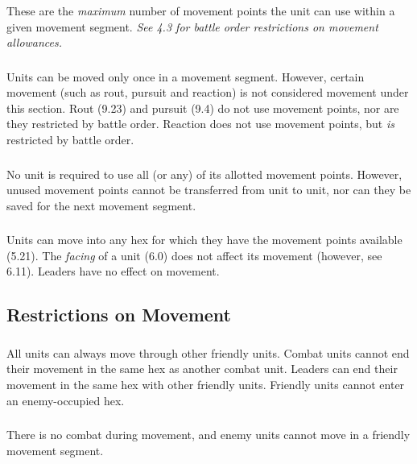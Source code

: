 These are the \textit{maximum} number of movement points the unit can use within a given movement segment. \textit{See 4.3 for battle order restrictions on movement allowances.}

\subsubsection[Movement Limits]{} Units can be moved only once in a movement segment. However, certain movement (such as rout, pursuit and reaction) is not considered movement under this section. Rout (9.23) and pursuit (9.4) do not use movement points, nor are they restricted by battle order. Reaction does not use movement points, but \textit{is} restricted by battle order.

\subsubsection[Movement Point Use]{} No unit is required to use all (or any) of its allotted movement points. However, unused movement points cannot be transferred from unit to unit, nor can they be saved for the next movement segment.

\subsubsection[Movement and Facing]{} Units can move into any hex for which they have the movement points available (5.21). The \textit{facing} of a unit (6.0) does not affect its movement (however, see 6.11). Leaders have no effect on movement.

\subsection{Restrictions on Movement}

\subsubsection[Moving Through Units]{} All units can always move through other friendly units. Combat units cannot end their movement in the same hex as another combat unit. Leaders can end their movement in the same hex with other friendly units. Friendly units cannot enter an enemy-occupied hex.

\subsubsection[Movement and Combat]{} There is no combat during movement, and enemy units cannot move in a friendly movement segment.

